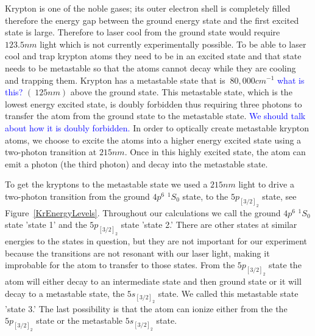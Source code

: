 \documentclass[prb,preprint]{revtex4-1}
\begin{document}
Krypton is one of the noble gases; its outer electron shell is completely filled therefore the energy gap between the ground energy state and the first excited state is large. Therefore to laser cool from the ground state would require $123.5 nm$ light which is not currently experimentally possible. To be able to laser cool and trap krypton atoms they need to be in an excited state and that state needs to be metastable so that the atoms cannot decay while they are cooling and trapping them. Krypton has a metastable state that is $~80,000 cm^{-1}$ \textcolor{blue}{what is this?} $(~125 nm)$ above the ground state.  This metastable state, which is the lowest energy excited state, is doubly forbidden thus requiring three photons to transfer the atom from the ground state to the metastable state. \textcolor{blue}{We should talk about how it is doubly forbidden.} In order to optically create metastable krypton atoms, we choose to excite the atoms into a higher energy excited state using a two-photon transition at $215 nm$.  Once in this highly excited state, the atom can emit a photon (the third photon) and decay into the metastable state. 

To get the kryptons to the metastable state we used a $215 nm$ light to drive a two-photon transition from the ground $4p^6$ $^1S_0$ state, to the $5p_{[3/2]_2}$ state, see Figure~\ref{KrEnergyLevels}. Throughout our calculations we call the ground $4p^6$ $^1S_0$ state 'state 1' and the $5p_{[3/2]_2}$ state 'state 2.' There are other states at similar energies to the states in question, but they are not important for our experiment because the transitions are not resonant with our laser light, making it improbable for the atom to transfer to those states. From the $5p_{[3/2]_2}$ state the atom will either decay to an intermediate state and then ground state or it will decay to a metastable state, the $5s_{[3/2]_2}$ state. We called this metastable state 'state 3.' The last possibility is that the atom can ionize either from the the $5p_{[3/2]_2}$ state or the metastable $5s_{[3/2]_2}$ state. 
\end{document}
